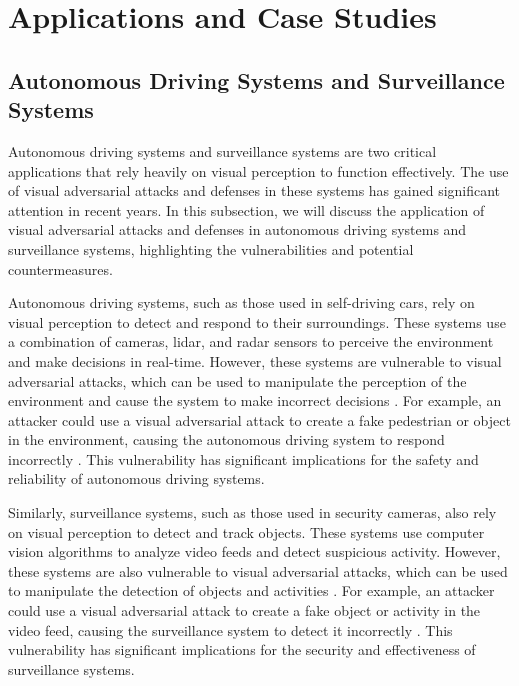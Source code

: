 \documentclass[11pt]{article}
\begin{document}
\section{Applications and Case Studies}

\subsection{Autonomous Driving Systems and Surveillance Systems}

Autonomous driving systems and surveillance systems are two critical applications that rely heavily on visual perception to function effectively. The use of visual adversarial attacks and defenses in these systems has gained significant attention in recent years. In this subsection, we will discuss the application of visual adversarial attacks and defenses in autonomous driving systems and surveillance systems, highlighting the vulnerabilities and potential countermeasures.

Autonomous driving systems, such as those used in self-driving cars, rely on visual perception to detect and respond to their surroundings. These systems use a combination of cameras, lidar, and radar sensors to perceive the environment and make decisions in real-time. However, these systems are vulnerable to visual adversarial attacks, which can be used to manipulate the perception of the environment and cause the system to make incorrect decisions \cite{ref6}. For example, an attacker could use a visual adversarial attack to create a fake pedestrian or object in the environment, causing the autonomous driving system to respond incorrectly \cite{ref115}. This vulnerability has significant implications for the safety and reliability of autonomous driving systems.

Similarly, surveillance systems, such as those used in security cameras, also rely on visual perception to detect and track objects. These systems use computer vision algorithms to analyze video feeds and detect suspicious activity. However, these systems are also vulnerable to visual adversarial attacks, which can be used to manipulate the detection of objects and activities \cite{ref116}. For example, an attacker could use a visual adversarial attack to create a fake object or activity in the video feed, causing the surveillance system to detect it incorrectly \cite{ref107}. This vulnerability has significant implications for the security and effectiveness of surveillance systems.
\end{document}

